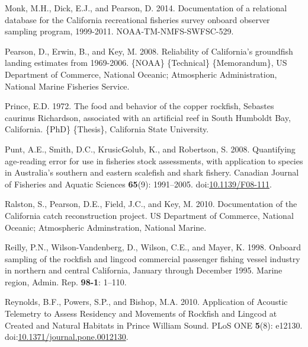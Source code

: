 \documentclass[11pt,
  english,
  letterpaper,
]{article}
\newlength{\cslhangindent}
\newenvironment{CSLReferences}[2] %
 {%
  \setlength{\parindent}{0pt}
  \ifodd #1 \everypar{\setlength{\hangindent}{\cslhangindent}}\ignorespaces\fi
  \ifnum #2 > 0
  \setlength{\parskip}{#2\baselineskip}
  \fi
 }%
 {}
\begin{document}
\begin{CSLReferences}{1}{0}
\leavevmode{}%
Monk, M.H., Dick, E.J., and Pearson, D. 2014. Documentation of a relational database for the {California} recreational fisheries survey onboard observer sampling program, 1999-2011. NOAA-TM-NMFS-SWFSC-529.

\leavevmode{}%
Pearson, D., Erwin, B., and Key, M. 2008. Reliability of {California}'s groundfish landing estimates from 1969-2006. \{NOAA\} \{Technical\} \{Memorandum\}, US Department of Commerce, National Oceanic; Atmospheric Administration, National Marine Fisheries Service.

\leavevmode{}%
Prince, E.D. 1972. The food and behavior of the copper rockfish, {Sebastes} caurinus {Richardson}, associated with an artificial reef in {South} {Humboldt} {Bay}, {California}. \{PhD\} \{Thesis\}, California State University.

\leavevmode{}%
Punt, A.E., Smith, D.C., KrusicGolub, K., and Robertson, S. 2008. Quantifying age-reading error for use in fisheries stock assessments, with application to species in {Australia}'s southern and eastern scalefish and shark fishery. Canadian Journal of Fisheries and Aquatic Sciences \textbf{65}(9): 1991--2005. doi:\href{https://doi.org/10.1139/F08-111}{10.1139/F08-111}.

\leavevmode{}%
Ralston, S., Pearson, D.E., Field, J.C., and Key, M. 2010. Documentation of the {California} catch reconstruction project. US Department of Commerce, National Oceanic; Atmospheric Adminstration, National Marine.

\leavevmode{}%
Reilly, P.N., Wilson-Vandenberg, D., Wilson, C.E., and Mayer, K. 1998. Onboard sampling of the rockfish and lingcod commercial passenger fishing vessel industry in northern and central {California}, {January} through {December} 1995. Marine region, Admin. Rep. \textbf{98-1}: 1--110.

\leavevmode{}%
Reynolds, B.F., Powers, S.P., and Bishop, M.A. 2010. Application of {Acoustic} {Telemetry} to {Assess} {Residency} and {Movements} of {Rockfish} and {Lingcod} at {Created} and {Natural} {Habitats} in {Prince} {William} {Sound}. PLoS ONE \textbf{5}(8): e12130. doi:\href{https://doi.org/10.1371/journal.pone.0012130}{10.1371/journal.pone.0012130}.


\end{CSLReferences}
\end{document}
